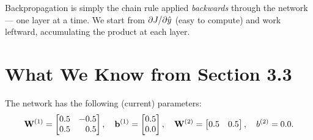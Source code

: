 \documentclass[12pt, a4paper]{article}
\begin{document}
\begin{notebox}
  Backpropagation is simply the chain rule applied \emph{backwards} through
  the network --- one layer at a time.  We start from $\partial J/\partial
    \hat{y}$ (easy to compute) and work leftward, accumulating the product at
  each layer.
\end{notebox}

\section{What We Know from Section 3.3}
The network has the following (current) parameters:
\[
  \mathbf{W}^{(1)} = \begin{bmatrix} 0.5 & -0.5 \\ 0.5 & \phantom{-}0.5 \end{bmatrix},
  \quad
  \mathbf{b}^{(1)} = \begin{bmatrix} 0.5 \\ 0.0 \end{bmatrix},
  \quad
  \mathbf{W}^{(2)} = \begin{bmatrix} 0.5 & 0.5 \end{bmatrix},
  \quad
  b^{(2)} = 0.0.
\]
\end{document}
